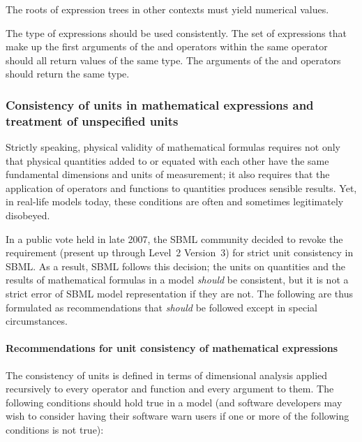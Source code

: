 The roots of expression trees in other contexts must yield
numerical values.

The type of expressions should be used consistently.  The set of
expressions that make up the first arguments of the 
and  operators within the same 
operator should all return values of the same type. The arguments
of the  and  operators should return the same
type.


\subsubsection{Consistency of units in mathematical expressions
  and treatment of unspecified units}
\label{sec:operator-arg-types}
\label{sec:unit-consistency}

Strictly speaking, physical validity of mathematical formulas
requires not only that physical quantities added to or equated
with each other have the same fundamental dimensions and units of
measurement; it also requires that the application of operators
and functions to quantities produces sensible results.  Yet, in
real-life models today, these conditions are often and sometimes
legitimately disobeyed.

In a public vote held in late 2007, the SBML community decided to
revoke the requirement (present up through Level~2 Version~3) for
strict unit consistency in SBML.  As a result, SBML \thisL follows
this decision; the units on quantities and the results of
mathematical formulas in a model \emph{should} be consistent, but
it is not a strict error of SBML model representation if they are
not.  The following are thus formulated as recommendations that
\emph{should} be followed except in special circumstances.


\paragraph{Recommendations for unit consistency of mathematical expressions}

The consistency of units is defined in terms of dimensional
analysis applied recursively to every operator and function and
every argument to them.  The following conditions should hold true
in a model (and software developers may wish to consider having
their software warn users if one or more of the following
conditions is not true):

